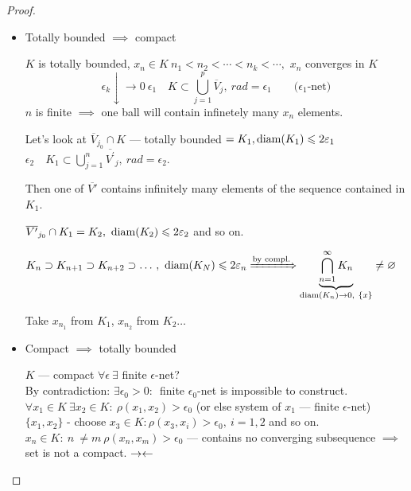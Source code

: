 \begin{proof}\leavevmode
  \begin{itemize}
    \item Totally bounded $\implies$ compact

      $K$ is totally bounded, $x_n \in K\ n_1 < n_2 < \dotsb < n_k < \dotsb,$
      $x_n$ converges in $K$
      \[\epsilon_k \downarrow \to 0\ \epsilon_1 \quad K \subset \bigcup\limits_{j = 1}^p \overline{V}_j,\ rad = \epsilon_1\qquad \text{($\epsilon_1$-net)} \]
      $n$ is finite $\implies$ one ball will contain infinetely many $x_n$ elements.

      Let's look at $\overline{V}_{j_0} \cap K$ --- totally bounded $= K_1, \operatorname{diam}({K_1}) \leqslant 2\varepsilon_1$ \\
      $\epsilon_2\quad K_1 \subset \bigcup\limits_{j =1}^n
      \overline{V^{'}}_{j},\ rad = \epsilon_2.$

      Then one of $\overline{V'}$ contains infinitely many elements of the sequence contained in $K_1$.

      $\overline{V'}_{j_0} \cap K_1 = K_2,\ \diam{K_2} \leq 2\epsilon_2$ and so on.

      $K_n \supset K_{n+1} \supset K_{n+2} \supset \dotso,\ \operatorname{diam}({K_N}) \leqslant 2\varepsilon_n
      \xRightarrow{\text{by compl.}} \underbrace{\bigcap\limits_{n = 1}^\infty K_n}_{\operatorname{diam}({K_n}) \to 0,\ \{x\}} \neq \varnothing$

      Take $x_{n_1}$ from $K_1$, $x_{n_2}$ from $K_2 \dotso$
    \item Compact $\implies$ totally bounded

      $K$ --- compact $\forall \epsilon\ \exists$ finite $\epsilon$-net? \\
      By contradiction: $\exists\epsilon_0 > 0\colon$\ finite $\epsilon_0$-net is impossible to construct. \\
    $\forall x_1 \in K\ \exists x_2 \in K \colon\ \rho(x_1, x_2) > \epsilon_0$ (or else system of $x_1$ --- finite $\epsilon$-net) \\
    $\{x_1, x_2\}$ - choose $x_3 \in K\colon \rho(x_3, x_i) > \epsilon_0,\ i = 1, 2$ and so on. \\
    $x_n \in K:\ n\ \neq m\ \rho(x_n, x_m) > \epsilon_0$ --- contains no converging subsequence $\implies$
    set is not a compact. $\rightarrow\leftarrow$ \qedhere
  \end{itemize}
\end{proof}
